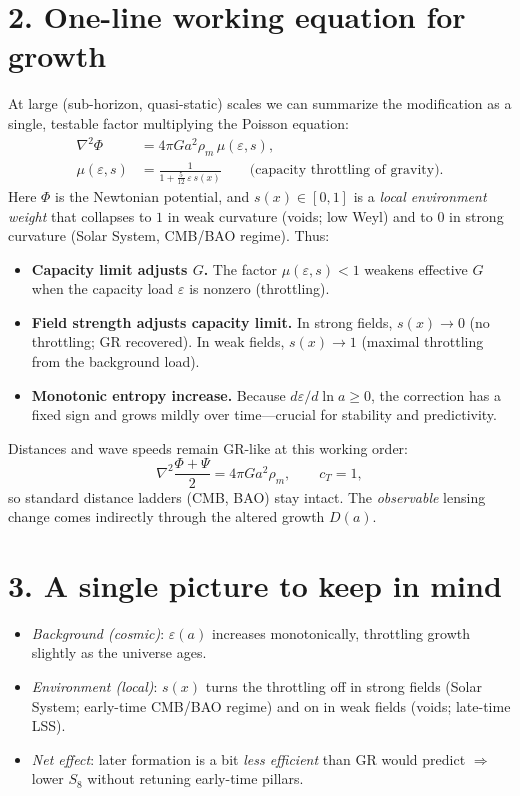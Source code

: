 \documentclass[aps,prd,onecolumn,superscriptaddress,nofootinbib]{revtex4-2}
\newcommand{\eps}{\varepsilon}
\begin{document}
\section*{2. One-line working equation for growth}
At large (sub-horizon, quasi-static) scales we can summarize the modification as a single, testable factor multiplying the Poisson equation:
\begin{align}
\nabla^2\Phi &= 4\pi G a^2 \rho_m \,\mu(\eps,s), \\
\mu(\eps,s) &= \frac{1}{1+\frac{5}{12}\,\eps\,s(x)} \qquad \text{(capacity throttling of gravity)}.
\end{align}
Here $\Phi$ is the Newtonian potential, and $s(x)\!\in[0,1]$ is a \emph{local environment weight} that collapses to $1$ in weak curvature (voids; low Weyl) and to $0$ in strong curvature (Solar System, CMB/BAO regime). Thus:

\begin{itemize}
\item \textbf{Capacity limit adjusts $G$.} The factor $\mu(\eps,s)<1$ weakens effective $G$ when the capacity load $\eps$ is nonzero (throttling).
\item \textbf{Field strength adjusts capacity limit.} In strong fields, $s(x)\!\to\!0$ (no throttling; GR recovered). In weak fields, $s(x)\!\to\!1$ (maximal throttling from the background load).
\item \textbf{Monotonic entropy increase.} Because $d\eps/d\ln a\!\ge\!0$, the correction has a fixed sign and grows mildly over time—crucial for stability and predictivity.
\end{itemize}

Distances and wave speeds remain GR-like at this working order:
\[
\nabla^2\frac{\Phi+\Psi}{2}=4\pi G a^2\rho_m, \qquad c_T=1,
\]
so standard distance ladders (CMB, BAO) stay intact. The \emph{observable} lensing change comes indirectly through the altered growth $D(a)$.

\section*{3. A single picture to keep in mind}
\begin{itemize}
\item \emph{Background (cosmic)}: $\eps(a)$ increases monotonically, throttling growth slightly as the universe ages.
\item \emph{Environment (local)}: $s(x)$ turns the throttling off in strong fields (Solar System; early-time CMB/BAO regime) and on in weak fields (voids; late-time LSS).
\item \emph{Net effect}: later formation is a bit \emph{less efficient} than GR would predict $\Rightarrow$ lower $S_8$ without retuning early-time pillars.
\end{itemize}
\end{document}
